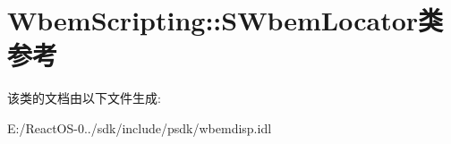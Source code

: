\hypertarget{class_wbem_scripting_1_1_s_wbem_locator}{}\section{Wbem\+Scripting\+:\+:S\+Wbem\+Locator类 参考}
\label{class_wbem_scripting_1_1_s_wbem_locator}


该类的文档由以下文件生成\+:\begin{DoxyCompactItemize}
\item 
E\+:/\+React\+O\+S-\/0../sdk/include/psdk/wbemdisp.\+idl\end{DoxyCompactItemize}
